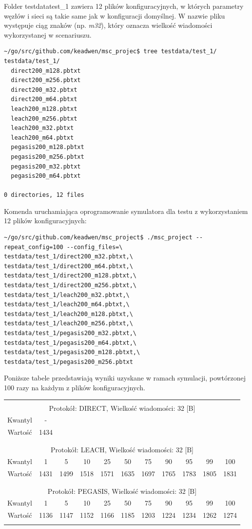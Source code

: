 \documentclass[a4paper,12pt,twoside,openany]{report}
\begin{document}
Folder testdata\/test\_1 zawiera 12 plików konfiguracyjnych, w których parametry węzłów i sieci są takie same jak w konfiguracji domyślnej.
W nazwie pliku występuje ciąg znaków (np. \textit{m32}), który oznacza wielkość wiadomości wykorzystanej w scenariuszu.

\begin{lstlisting}
~/go/src/github.com/keadwen/msc_projec$ tree testdata/test_1/
testdata/test_1/
  direct200_m128.pbtxt
  direct200_m256.pbtxt
  direct200_m32.pbtxt
  direct200_m64.pbtxt
  leach200_m128.pbtxt
  leach200_m256.pbtxt
  leach200_m32.pbtxt
  leach200_m64.pbtxt
  pegasis200_m128.pbtxt
  pegasis200_m256.pbtxt
  pegasis200_m32.pbtxt
  pegasis200_m64.pbtxt

0 directories, 12 files
\end{lstlisting}

Komenda uruchamiająca oprogramowanie symulatora dla testu z wykorzystaniem 12 plików konfiguracyjnych:

\begin{lstlisting}
~/go/src/github.com/keadwen/msc_project$ ./msc_project --repeat_config=100 --config_files=\
testdata/test_1/direct200_m32.pbtxt,\
testdata/test_1/direct200_m64.pbtxt,\
testdata/test_1/direct200_m128.pbtxt,\
testdata/test_1/direct200_m256.pbtxt,\
testdata/test_1/leach200_m32.pbtxt,\
testdata/test_1/leach200_m64.pbtxt,\
testdata/test_1/leach200_m128.pbtxt,\
testdata/test_1/leach200_m256.pbtxt,\
testdata/test_1/pegasis200_m32.pbtxt,\
testdata/test_1/pegasis200_m64.pbtxt,\
testdata/test_1/pegasis200_m128.pbtxt,\
testdata/test_1/pegasis200_m256.pbtxt
\end{lstlisting}

Poniższe tabele przedstawiają wyniki uzyskane w ramach symulacji, powtórzonej 100 razy na każdym z plików konfiguracyjnych.

\begin{longtable}{*{11}{c}}
\toprule \\*
\multicolumn{11}{c}{Protokół: DIRECT, Wielkość wiadomości: 32 [B]} \\*
Kwantyl	& -	\\*
Wartość	& 1434	\\*
\midrule \\*
\\*
\multicolumn{11}{c}{Protokół: LEACH, Wielkość wiadomości: 32 [B]} \\*
Kwantyl	& 1	& 5	& 10	& 25	& 50	& 75	& 90	& 95	& 99	& 100	\\*
Wartość	& 1431	& 1499	& 1518	& 1571	& 1635	& 1697	& 1765	& 1783	& 1805	& 1831	\\*
\midrule \\*
\\*
\multicolumn{11}{c}{Protokół: PEGASIS, Wielkość wiadomości: 32 [B]} \\*
Kwantyl	& 1	& 5	& 10	& 25	& 50	& 75	& 90	& 95	& 99	& 100	\\*
Wartość	& 1136	& 1147	& 1152	& 1166	& 1185	& 1203	& 1224	& 1234	& 1262	& 1274	\\*
\bottomrule \\*
\end{longtable}
\end{document}
